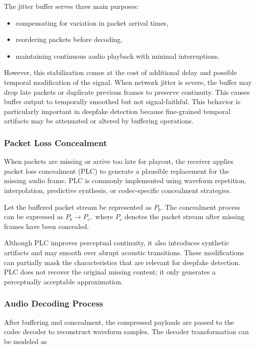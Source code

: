 The jitter buffer serves three main purposes:
\begin{itemize}
    \item compensating for variation in packet arrival times,
    \item reordering packets before decoding,
    \item maintaining continuous audio playback with minimal interruptions.
\end{itemize}

However, this stabilization comes at the cost of additional delay and possible temporal modification of the signal. When network jitter is severe, the buffer may drop late packets or duplicate previous frames to preserve continuity. This causes buffer output to temporally smoothed but not signal-faithful. This behavior is particularly important in deepfake detection because fine-grained temporal artifacts may be attenuated or altered by buffering operations.

\subsubsection{Packet Loss Concealment}

When packets are missing or arrive too late for playout, the receiver applies packet loss concealment (PLC) to generate a plausible replacement for the missing audio frame. PLC is commonly implemented using waveform repetition, interpolation, predictive synthesis, or codec-specific concealment strategies.

Let the buffered packet stream be represented as \(P_b\). The concealment process can be expressed as
$P_b \rightarrow P_c,$
where \(P_c\) denotes the packet stream after missing frames have been concealed.

Although PLC improves perceptual continuity, it also introduces synthetic artifacts and may smooth over abrupt acoustic transitions. These modifications can partially mask the characteristics that are relevant for deepfake detection. PLC does not recover the original missing content; it only generates a perceptually acceptable approximation.

\subsubsection{Audio Decoding Process}

After buffering and concealment, the compressed payloads are passed to the codec decoder to reconstruct waveform samples. The decoder transformation can be modeled as

